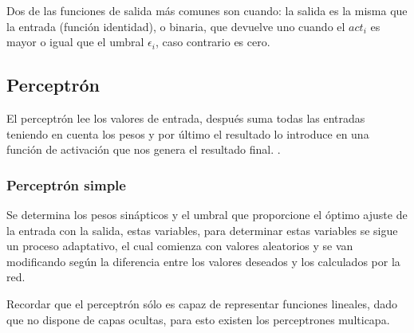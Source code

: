 Dos de las funciones de salida más comunes son cuando: la salida es la misma que la entrada (función identidad), o binaria, que devuelve uno cuando el $act_{i}$ es mayor  o igual que el umbral $\epsilon_{i}$, caso contrario es cero. 

\subsection{Perceptrón}
El perceptrón lee los valores de entrada, después suma todas las entradas teniendo en cuenta los pesos y por último el resultado lo introduce en una función de activación que nos genera el resultado final. \citep{perceptron2017}.

\subsubsection{Perceptrón simple}
Se determina los pesos sinápticos y el umbral que proporcione el óptimo ajuste de la entrada con la salida, estas variables, para determinar estas variables se sigue un proceso adaptativo, el cual  comienza con valores aleatorios y se van modificando según la diferencia entre los valores deseados y los calculados por la red.

Recordar que el perceptrón sólo es capaz de representar funciones lineales, dado que no dispone de capas ocultas, para esto existen los perceptrones multicapa.

